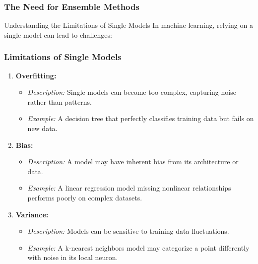\documentclass[aspectratio=169]{beamer}
\begin{document}
\begin{frame}[fragile]
    \frametitle{The Need for Ensemble Methods}
    \begin{block}{Understanding the Limitations of Single Models}
        In machine learning, relying on a single model can lead to challenges:
    \end{block}
\end{frame}

\begin{frame}[fragile]
    \frametitle{Limitations of Single Models}
    \begin{enumerate}
        \item \textbf{Overfitting:}
        \begin{itemize}
            \item \textit{Description:} Single models can become too complex, capturing noise rather than patterns.
            \item \textit{Example:} A decision tree that perfectly classifies training data but fails on new data.
        \end{itemize}

        \item \textbf{Bias:}
        \begin{itemize}
            \item \textit{Description:} A model may have inherent bias from its architecture or data.
            \item \textit{Example:} A linear regression model missing nonlinear relationships performs poorly on complex datasets.
        \end{itemize}

        \item \textbf{Variance:}
        \begin{itemize}
            \item \textit{Description:} Models can be sensitive to training data fluctuations.
            \item \textit{Example:} A k-nearest neighbors model may categorize a point differently with noise in its local neuron.
        \end{itemize}
    \end{enumerate}
\end{frame}
\end{document}
